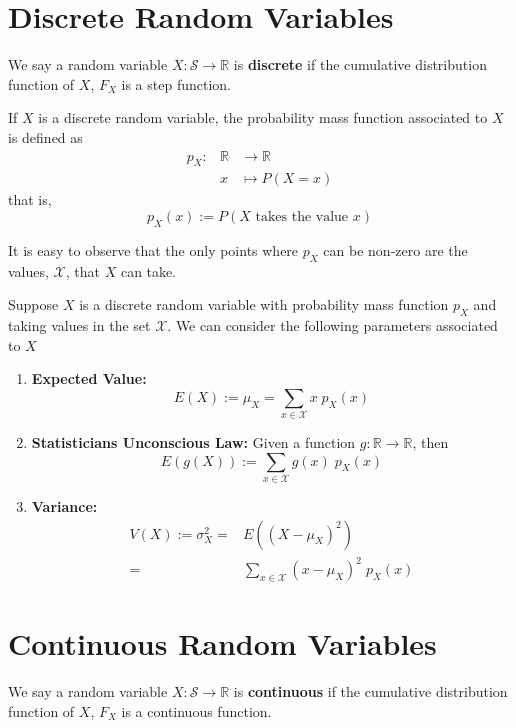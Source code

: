 \section{Discrete Random Variables}

\begin{defn}
    We say a random variable $X: \mathcal{S} \longrightarrow \mathbb{R}$ is \textbf{discrete} if the cumulative distribution function of $X$, $F_X$ is a step function. 
\end{defn}

\begin{defn}
    If $X$ is a discrete random variable, the probability mass function associated to $X$ is defined as 
    \begin{eqnarray*}
        p_X :& \mathbb{R} &\longrightarrow \mathbb{R}\\
        & x &\mapsto P(X = x)
    \end{eqnarray*}
    that is, 
    $$p_X(x) := P(\text{$X$ takes the value $x$})$$
\end{defn}
It is easy to observe that the only points where $p_X$ can be non-zero are the values, $\mathcal{X}$, that $X$ can take. 

\begin{defn}
Suppose $X$ is a discrete random variable with probability mass function $p_X$ and taking values in the set $\mathcal{X}$. We can consider the following parameters associated to $X$
\begin{enumerate}
    \item \textbf{Expected Value:}
    $$E(X) := \mu_X = \sum_{x\in \mathcal{X}} x\; p_X(x)$$
    \item \textbf{Statisticians Unconscious Law:} Given a function $g: \mathbb{R} \longrightarrow \mathbb{R}$, then 
    $$E(g(X)) := \sum_{x\in \mathcal{X}} g(x) \; p_X(x)$$
    \item \textbf{Variance:}
    \begin{eqnarray*}
        V(X) := \sigma^2_X =& E ((X-\mu_X)^2)\\
        =& \sum_{x\in \mathcal{X}} (x-\mu_X)^2\; p_X(x)
    \end{eqnarray*}
    
\end{enumerate}
    
\end{defn}


\section{Continuous Random Variables}
\begin{defn}
We say a random variable $X: \mathcal{S} \longrightarrow \mathbb{R}$ is \textbf{continuous} if the cumulative distribution function of $X$, $F_X$ is a continuous function.
\end{defn}

